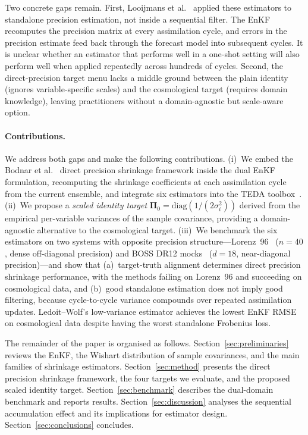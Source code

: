 Two concrete gaps remain. First, Looijmans et al.~\cite{looijmans2024comparison} applied these estimators to standalone precision estimation, not inside a sequential filter. The EnKF recomputes the precision matrix at every assimilation cycle, and errors in the precision estimate feed back through the forecast model into subsequent cycles. It is unclear whether an estimator that performs well in a one-shot setting will also perform well when applied repeatedly across hundreds of cycles. Second, the direct-precision target menu lacks a middle ground between the plain identity (ignores variable-specific scales) and the cosmological target (requires domain knowledge), leaving practitioners without a domain-agnostic but scale-aware option.

\paragraph{Contributions.}
We address both gaps and make the following contributions.
(i)~We embed the Bodnar et al.~\cite{bodnar2016direct} direct precision shrinkage framework inside the dual EnKF formulation, recomputing the shrinkage coefficients at each assimilation cycle from the current ensemble, and integrate six estimators into the TEDA toolbox~\cite{nino2022teda}.
(ii)~We propose a \emph{scaled identity target} $\boldsymbol{\Pi}_0 = \mathrm{diag}(1/(2\sigma_i^2))$ derived from the empirical per-variable variances of the sample covariance, providing a domain-agnostic alternative to the cosmological target.
(iii)~We benchmark the six estimators on two systems with opposite precision structure---Lorenz~96~\cite{lorenz1996predictability} ($n = 40$, dense off-diagonal precision) and BOSS DR12 mocks~\cite{looijmans2024comparison} ($d = 18$, near-diagonal precision)---and show that (a)~target-truth alignment determines direct precision shrinkage performance, with the methods failing on Lorenz~96 and succeeding on cosmological data, and (b)~good standalone estimation does not imply good filtering, because cycle-to-cycle variance compounds over repeated assimilation updates. Ledoit--Wolf's low-variance estimator achieves the lowest EnKF RMSE on cosmological data despite having the worst standalone Frobenius loss.

The remainder of the paper is organised as follows. Section~\ref{sec:preliminaries} reviews the EnKF, the Wishart distribution of sample covariances, and the main families of shrinkage estimators. Section~\ref{sec:method} presents the direct precision shrinkage framework, the four targets we evaluate, and the proposed scaled identity target. Section~\ref{sec:benchmark} describes the dual-domain benchmark and reports results. Section~\ref{sec:discussion} analyses the sequential accumulation effect and its implications for estimator design. Section~\ref{sec:conclusions} concludes.
